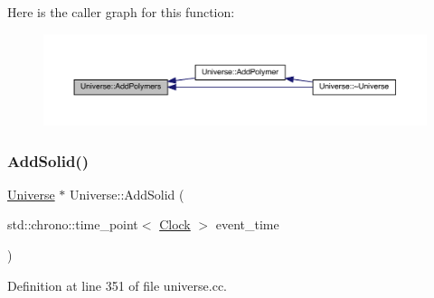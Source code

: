 Here is the caller graph for this function\+:
\nopagebreak
\begin{figure}[H]
\begin{center}
\leavevmode
\includegraphics[width=350pt]{class_universe_aed7cb25507d516a2821ebb69d5345c54_icgraph}
\end{center}
\end{figure}
\mbox{\label{class_universe_a598799e2fcdf9ed60e83e9f5a61bfc05}} 
\subsubsection{\texorpdfstring{Add\+Solid()}{AddSolid()}}
{\footnotesize\ttfamily \hyperlink{class_universe}{Universe} $\ast$ Universe\+::\+Add\+Solid (\begin{DoxyParamCaption}\item[{std\+::chrono\+::time\+\_\+point$<$ \hyperlink{universe_8h_a0ef8d951d1ca5ab3cfaf7ab4c7a6fd80}{Clock} $>$}]{event\+\_\+time }\end{DoxyParamCaption})}



Definition at line 351 of file universe.\+cc.


